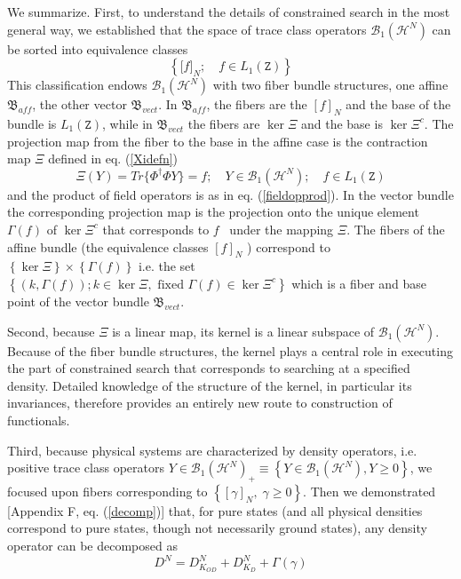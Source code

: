 \documentclass[aps,preprint]{revtex4}%
\begin{document}
We summarize. First, to understand the details of constrained search in the
most general way, we established that the space of trace class operators
$\mathcal{B}_{1}(\mathcal{H}^{N})$ can be sorted into equivalence classes
\begin{equation}
\left\{  \lbrack f]_{N};\quad f\in L_{1}(\mathtt{Z})\right\}
\label{summequiv}%
\end{equation}
This classification endows $\mathcal{B}_{1}(\mathcal{H}^{N})$ with two fiber
bundle structures, one affine $\mathfrak{B}_{aff}$, the other vector
$\mathfrak{B}_{vect}$. In $\mathfrak{B}_{aff}$, the fibers are the $[f]_{N}$
and the base of the bundle is $L_{1}(\mathtt{Z})$, while in $\mathfrak{B}%
_{vect}$ the fibers are $\ker\Xi$ and the base is $\ker\Xi^{c}$. The
projection map from the fiber to the base in the affine case is the
contraction map $\Xi$ defined in eq. (\ref{Xidefn})
\begin{equation}
\Xi(Y)=Tr\{\Phi^{\dagger}\Phi Y\}=f;\quad Y\in\mathcal{B}_{1}(\mathcal{H}%
^{N});\quad f\in L_{1}(\mathtt{Z}) \label{summXidefn}%
\end{equation}
and the product of field operators is as in eq. (\ref{fieldopprod}). In the
vector bundle the corresponding projection map is the projection onto the
unique element $\Gamma\left(  f\right)  $ of $\ker\Xi^{c}$ that corresponds to
$f$ \ under the mapping $\Xi$. The fibers of the affine bundle (the
equivalence classes $[f]_{N}$ ) correspond to $\left\{  \ker\Xi\right\}
\times\left\{  \Gamma\left(  f\right)  \right\}  $ i.e. the set $\left\{
\left(  k,\Gamma\left(  f\right)  \right)  ;k\in\ker\Xi,\text{ fixed }%
\Gamma\left(  f\right)  \in\ker\Xi^{c}\right\}  $ which is a fiber and base
point of the vector bundle $\mathfrak{B}_{vect}$.

Second, because $\Xi$ is a linear map, its kernel is a linear subspace of
$\mathcal{B}_{1}(\mathcal{H}^{N})$. Because of the fiber bundle structures,
the kernel plays a central role in executing the part of constrained search
that corresponds to searching at a specified density. Detailed knowledge of
the structure of the kernel, in particular its invariances, therefore provides
an entirely new route to construction of functionals.

Third, because physical systems are characterized by density operators, i.e.
positive trace class operators $Y\in\mathcal{B}_{1}(\mathcal{H}^{N})_{+}%
\equiv\left\{  Y\in\mathcal{B}_{1}(\mathcal{H}^{N}),Y\geq0\right\}  $, we
focused upon fibers corresponding to $\left\{  [\gamma]_{N},\;\gamma
\geq0\right\}  $. Then we demonstrated [Appendix F, eq. (\ref{decomp})] that,
for pure states (and all physical densities correspond to pure states, though
not necessarily ground states), any density operator can be decomposed as
\begin{equation}
D^{N}=D_{K_{OD}}^{N}+D_{K_{D}}^{N}+\Gamma\left(  \gamma\right)
\end{equation}
\end{document}
